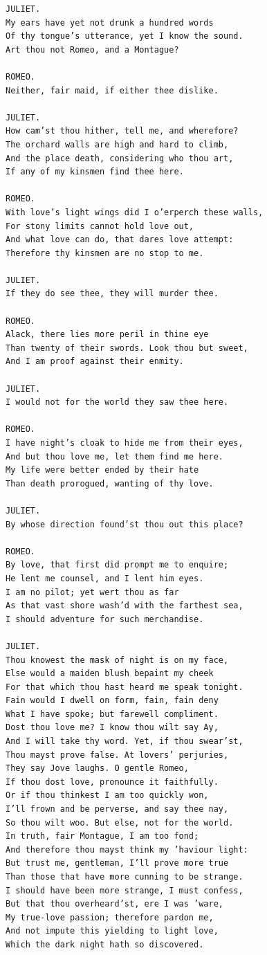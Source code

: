 \documentclass{article}
\begin{document}
\begin{verbatim}
JULIET.
My ears have yet not drunk a hundred words
Of thy tongue’s utterance, yet I know the sound.
Art thou not Romeo, and a Montague?

ROMEO.
Neither, fair maid, if either thee dislike.

JULIET.
How cam’st thou hither, tell me, and wherefore?
The orchard walls are high and hard to climb,
And the place death, considering who thou art,
If any of my kinsmen find thee here.

ROMEO.
With love’s light wings did I o’erperch these walls,
For stony limits cannot hold love out,
And what love can do, that dares love attempt:
Therefore thy kinsmen are no stop to me.

JULIET.
If they do see thee, they will murder thee.

ROMEO.
Alack, there lies more peril in thine eye
Than twenty of their swords. Look thou but sweet,
And I am proof against their enmity.

JULIET.
I would not for the world they saw thee here.

ROMEO.
I have night’s cloak to hide me from their eyes,
And but thou love me, let them find me here.
My life were better ended by their hate
Than death prorogued, wanting of thy love.

JULIET.
By whose direction found’st thou out this place?

ROMEO.
By love, that first did prompt me to enquire;
He lent me counsel, and I lent him eyes.
I am no pilot; yet wert thou as far
As that vast shore wash’d with the farthest sea,
I should adventure for such merchandise.

JULIET.
Thou knowest the mask of night is on my face,
Else would a maiden blush bepaint my cheek
For that which thou hast heard me speak tonight.
Fain would I dwell on form, fain, fain deny
What I have spoke; but farewell compliment.
Dost thou love me? I know thou wilt say Ay,
And I will take thy word. Yet, if thou swear’st,
Thou mayst prove false. At lovers’ perjuries,
They say Jove laughs. O gentle Romeo,
If thou dost love, pronounce it faithfully.
Or if thou thinkest I am too quickly won,
I’ll frown and be perverse, and say thee nay,
So thou wilt woo. But else, not for the world.
In truth, fair Montague, I am too fond;
And therefore thou mayst think my ’haviour light:
But trust me, gentleman, I’ll prove more true
Than those that have more cunning to be strange.
I should have been more strange, I must confess,
But that thou overheard’st, ere I was ’ware,
My true-love passion; therefore pardon me,
And not impute this yielding to light love,
Which the dark night hath so discovered.


\end{verbatim}
\end{document}
